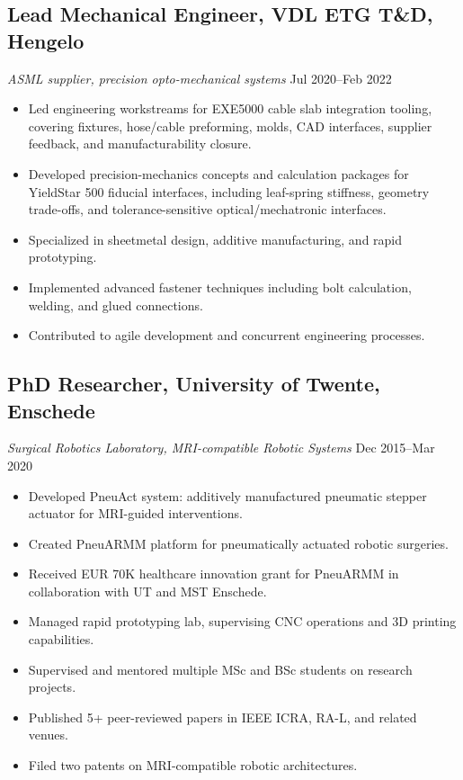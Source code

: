 \documentclass[11pt,a4paper]{article}
\begin{document}
\subsection{Lead Mechanical Engineer, VDL ETG T\&D, Hengelo}
{\small\textit{ASML supplier, precision opto-mechanical systems}} \hfill {\small Jul 2020--Feb 2022}
\begin{itemize}
 \item Led engineering workstreams for EXE5000 cable slab integration tooling, covering fixtures, hose/cable preforming, molds, CAD interfaces, supplier feedback, and manufacturability closure.
 \item Developed precision-mechanics concepts and calculation packages for YieldStar 500 fiducial interfaces, including leaf-spring stiffness, geometry trade-offs, and tolerance-sensitive optical/mechatronic interfaces.
 \item Specialized in sheetmetal design, additive manufacturing, and rapid prototyping.
 \item Implemented advanced fastener techniques including bolt calculation, welding, and glued connections.
 \item Contributed to agile development and concurrent engineering processes.
\end{itemize}

\subsection{PhD Researcher, University of Twente, Enschede}
{\small\textit{Surgical Robotics Laboratory, MRI-compatible Robotic Systems}} \hfill {\small Dec 2015--Mar 2020}
\begin{itemize}
 \item Developed PneuAct system: additively manufactured pneumatic stepper actuator for MRI-guided interventions.
 \item Created PneuARMM platform for pneumatically actuated robotic surgeries.
 \item Received EUR 70K healthcare innovation grant for PneuARMM in collaboration with UT and MST Enschede.
 \item Managed rapid prototyping lab, supervising CNC operations and 3D printing capabilities.
 \item Supervised and mentored multiple MSc and BSc students on research projects.
 \item Published 5+ peer-reviewed papers in IEEE ICRA, RA-L, and related venues.
 \item Filed two patents on MRI-compatible robotic architectures.
\end{itemize}
\end{document}
